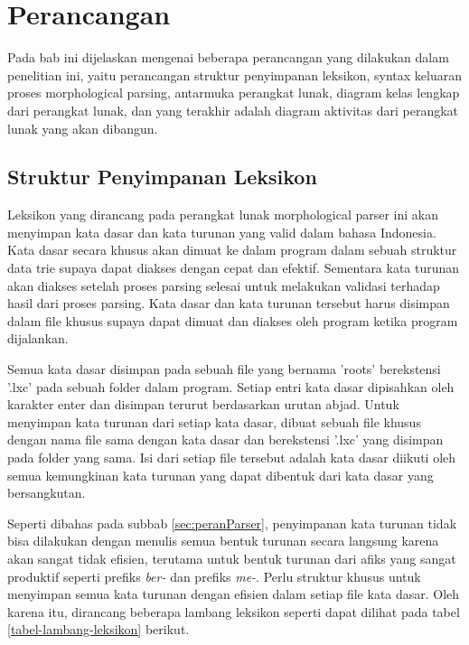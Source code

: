 \chapter{Perancangan}
\label{chap:perancangan}

Pada bab ini dijelaskan mengenai beberapa perancangan yang dilakukan dalam penelitian ini, yaitu perancangan struktur penyimpanan leksikon, syntax keluaran proses morphological parsing, antarmuka perangkat lunak, diagram kelas lengkap dari perangkat lunak, dan yang terakhir adalah diagram aktivitas dari perangkat lunak yang akan dibangun.

\section{Struktur Penyimpanan Leksikon}
\label{sec:strukturPenyimpananLeksikon}

Leksikon yang dirancang pada perangkat lunak morphological parser ini akan menyimpan kata dasar dan kata turunan yang valid dalam bahasa Indonesia. Kata dasar secara khusus akan dimuat ke dalam program dalam sebuah struktur data trie supaya dapat diakses dengan cepat dan efektif. Sementara kata turunan akan diakses setelah proses parsing selesai untuk melakukan validasi terhadap hasil dari proses parsing. Kata dasar dan kata turunan tersebut harus disimpan dalam file khusus supaya dapat dimuat dan diakses oleh program ketika program dijalankan.

Semua kata dasar disimpan pada sebuah file yang bernama 'roots' berekstensi '.lxc' pada sebuah folder dalam program. Setiap entri kata dasar dipisahkan oleh karakter enter dan disimpan terurut berdasarkan urutan abjad. Untuk menyimpan kata turunan dari setiap kata dasar, dibuat sebuah file khusus dengan nama file sama dengan kata dasar dan berekstensi '.lxc' yang disimpan pada folder yang sama. Isi dari setiap file tersebut adalah kata dasar diikuti oleh semua kemungkinan kata turunan yang dapat dibentuk dari kata dasar yang bersangkutan.

Seperti dibahas pada subbab \ref{sec:peranParser}, penyimpanan kata turunan tidak bisa dilakukan dengan menulis semua bentuk turunan secara langsung karena akan sangat tidak efisien, terutama untuk bentuk turunan dari afiks yang sangat produktif seperti prefiks \textit{ber-} dan prefiks \textit{me-}. Perlu struktur khusus untuk menyimpan semua kata turunan dengan efisien dalam setiap file kata dasar. Oleh karena itu, dirancang beberapa lambang leksikon seperti dapat dilihat pada tabel \ref{tabel-lambang-leksikon} berikut.

